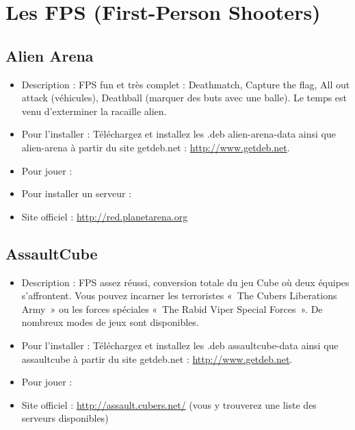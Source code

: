 \section{Les FPS (First-Person Shooters)}
\subsection{Alien Arena}
\begin{itemize}
\begingroup
{}
\item Description : FPS fun et très complet : Deathmatch, Capture the flag, All out attack (véhicules), Deathball (marquer des buts avec une balle). Le temps est venu d'exterminer la racaille alien.{\par}
\item Pour l'installer : Téléchargez et installez les .deb alien-arena-data ainsi que alien-arena à partir du site getdeb.net :
\url{http://www.getdeb.net}.{\par}
\item Pour jouer : 
\item Pour installer un serveur : 
\item Site officiel : \url{http://red.planetarena.org}{\par}
\endgroup
\end{itemize}
\subsection{AssaultCube}
\begin{itemize}
\begingroup
{}
\item Description : FPS assez réussi, conversion totale du jeu Cube où deux équipes s'affrontent. Vous pouvez incarner les terroristes «~The Cubers Liberations Army~» ou les forces spéciales «~The Rabid Viper Special Forces~». De nombreux modes de jeux sont disponibles.{\par}
\endgroup
\item Pour l'installer : Téléchargez et installez les .deb assaultcube-data ainsi que assaultcube à partir du site getdeb.net :
\url{http://www.getdeb.net}.{\par}
\item Pour jouer : 
\item Site officiel : \url{http://assault.cubers.net/} (vous y trouverez une liste des serveurs disponibles){\par}
\end{itemize}
